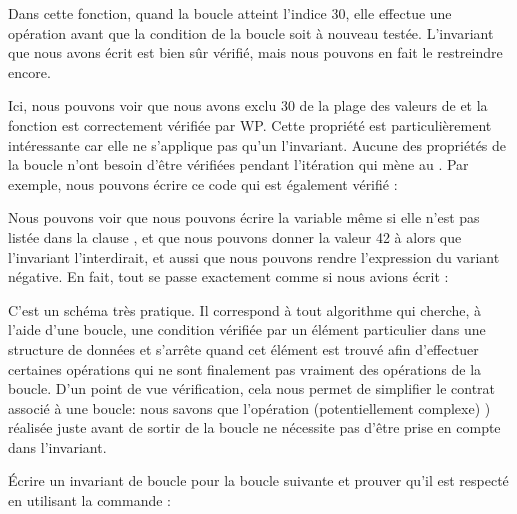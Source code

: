 

Dans cette fonction, quand la boucle atteint l'indice 30, elle effectue une opération
 avant que la condition de la boucle soit à nouveau testée. 
L'invariant que nous avons écrit est bien sûr vérifié, mais nous pouvons en fait le
restreindre encore.






Ici, nous pouvons voir que nous avons exclu 30 de la plage des valeurs de
 et la fonction est correctement vérifiée par WP. Cette propriété
est particulièrement intéressante car elle ne s'applique pas qu'un l'invariant. 
Aucune des propriétés de la boucle n'ont besoin d'être vérifiées pendant l'itération
qui mène au . Par exemple, nous pouvons écrire ce code qui est
également vérifié :





Nous pouvons voir que nous pouvons écrire la variable  même si elle
n'est pas listée dans la clause , et que nous pouvons
donner la valeur 42 à  alors que l'invariant l'interdirait, et aussi
que nous pouvons rendre l'expression du variant négative. En fait, tout se passe
exactement comme si nous avions écrit :





C'est un schéma très pratique. Il correspond à tout algorithme qui cherche, à l'aide
d'une boucle, une condition vérifiée par un élément particulier dans une structure 
de données et s'arrête quand cet élément est trouvé afin d'effectuer certaines
opérations qui ne sont finalement pas vraiment des opérations de la boucle. D'un
point de vue vérification, cela nous permet de simplifier le contrat associé à une
boucle: nous savons que l'opération (potentiellement complexe) ) réalisée juste 
avant de sortir de la boucle ne nécessite pas d'être prise en compte dans
l'invariant.






Écrire un invariant de boucle pour la boucle suivante et prouver qu'il est respecté
en utilisant la commande :


